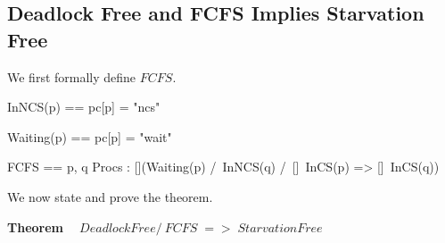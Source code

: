 \documentclass[fleqn,leqno]{article}
\begin{document}
\subsection*{Deadlock Free and FCFS Implies Starvation Free}

We first formally define $FCFS$.
\begin{display}
\begin{tla}
InNCS(p)   == pc[p] = "ncs"

Waiting(p) == pc[p] = "wait"

FCFS  == 
   \A p, q \in Procs : 
       [](Waiting(p)  /\  InNCS(q)  /\  []~InCS(p)  =>  []~InCS(q))
\end{tla}
\begin{tlatex}
%
\@pvspace{8.0pt}%
%
\@pvspace{8.0pt}%
%
%
\end{tlatex}
\end{display}
We now state and prove the theorem.

\bigskip

%
\noindent \textbf{Theorem \ } $DeadlockFree /\ FCFS \;=>\; StarvationFree$
\end{document}
